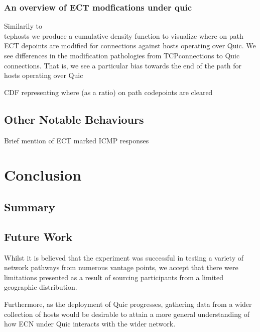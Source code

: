 \documentclass{l4proj}
\begin{document}
\subsection{An overview of ECT modfications under quic}

Similarily to \\tcphosts we produce a cumulative density function to visualize where on path ECT depoints are modified for connections against hosts operating over Quic. We see differences in the modification pathologies from TCPconnections to Quic connections. That is, we see a particular bias towards the end of the path for hosts operating over Quic

CDF representing where (as a ratio) on path codepoints are cleared


\section{Other Notable Behaviours}

{{Brief mention of ECT marked ICMP responses}}



\chapter{Conclusion}    
\section{Summary}


\section{Future Work}

Whilst it is believed that the experiment was successful in testing a variety of network pathways from numerous vantage points, we accept that there were limitations presented as a result of sourcing participants from a limited geographic distribution.

Furthermore, as the deployment of Quic progresses, gathering data from a wider collection of hosts would be desirable to attain a more general understanding of how ECN under Quic interacts with the wider network.


%
% 
\end{document}

